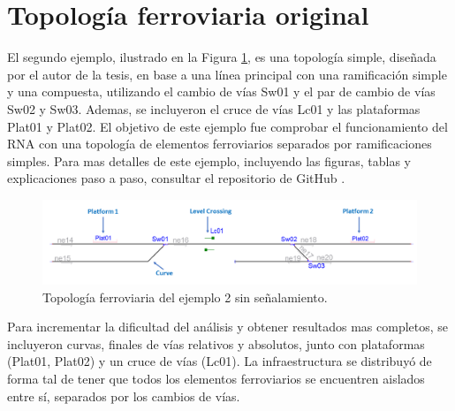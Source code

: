 \section{Topología ferroviaria original}

	El segundo ejemplo, ilustrado en la Figura \ref{fig:EJ2_1}, es una topología simple, diseñada por el autor de la tesis, en base a una línea principal con una ramificación simple y una compuesta, utilizando el cambio de vías Sw01 y el par de cambio de vías Sw02 y Sw03. Ademas, se incluyeron el cruce de vías Lc01 y las plataformas Plat01 y Plat02. El objetivo de este ejemplo fue comprobar el funcionamiento del RNA con una topología de elementos ferroviarios separados por ramificaciones simples. Para mas detalles de este ejemplo, incluyendo las figuras, tablas y explicaciones paso a paso, consultar el repositorio de GitHub \cite{GITHUB_PHD}.
	
	\begin{figure}[H]
		\centering
		\includegraphics[width=1\textwidth]{resultados-obtenidos/ejemplo2/images/2_empty.png}
		\centering\caption{Topología ferroviaria del ejemplo 2 sin señalamiento.}
		\label{fig:EJ2_1}
	\end{figure}
	
	Para incrementar la dificultad del análisis y obtener resultados mas completos, se incluyeron curvas, finales de vías relativos y absolutos, junto con plataformas (Plat01, Plat02) y un cruce de vías (Lc01). La infraestructura se distribuyó de forma tal de tener que todos los elementos ferroviarios se encuentren aislados entre sí, separados por los cambios de vías.